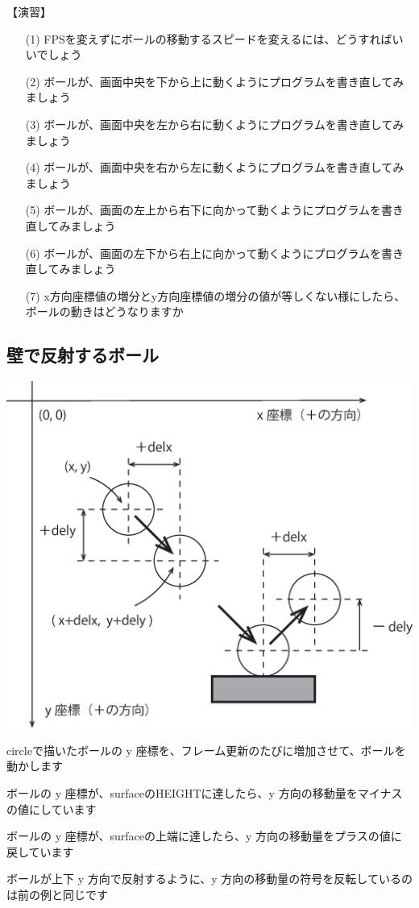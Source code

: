 \documentclass[uplatex,a4paper,11pt,oneside,openany]{jsbook}
\begin{document}
【演習】
\begin{enumerate}
\item[(1)] FPSを変えずにボールの移動するスピードを変えるには、どうすればいいでしょう
\item[(2)] ボールが、画面中央を下から上に動くようにプログラムを書き直してみましょう
\item[(3)] ボールが、画面中央を左から右に動くようにプログラムを書き直してみましょう
\item[(4)] ボールが、画面中央を右から左に動くようにプログラムを書き直してみましょう
\item[(5)] ボールが、画面の左上から右下に向かって動くようにプログラムを書き直してみましょう
\item[(6)] ボールが、画面の左下から右上に向かって動くようにプログラムを書き直してみましょう
\item[(7)] x方向座標値の増分とy方向座標値の増分の値が等しくない様にしたら、ボールの動きはどうなりますか
\end{enumerate}

\subsection{壁で反射するボール}

\begin{center}
\includegraphics[width=0.5\hsize]{./figure/pg06.eps}
\end{center}

circleで描いたボールの y 座標を、フレーム更新のたびに増加させて、ボールを動かします

ボールの y 座標が、surfaceのHEIGHTに達したら、y 方向の移動量をマイナスの値にしています

ボールの y 座標が、surfaceの上端に達したら、y 方向の移動量をプラスの値に戻しています



ボールが上下 y 方向で反射するように、y 方向の移動量の符号を反転しているのは前の例と同じです
\end{document}
